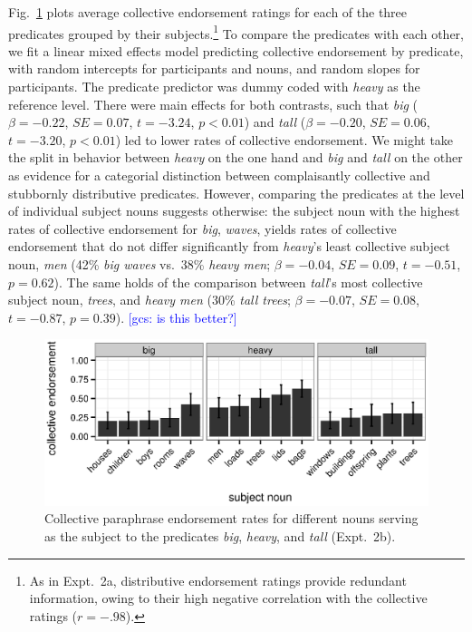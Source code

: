 \documentclass[linguex]{sp}
\newcommand{\ndg}[1]{\textcolor{Green}{[ndg: #1]}}
\newcommand{\gcs}[1]{\textcolor{blue}{[gcs: #1]}}
\begin{document}

Fig.~\ref{bhtcoll} plots average collective endorsement ratings for each of the three predicates grouped by their subjects.\footnote{As in Expt.~2a, distributive endorsement ratings provide redundant information, owing to their high negative correlation with the collective ratings ($r=-.98$).}
%
%
To compare the predicates with each other, we fit a linear mixed effects model predicting collective endorsement by predicate, with random intercepts for participants and nouns, and random slopes for participants. The predicate predictor was dummy coded with \emph{heavy} as the reference level. There were main effects for both contrasts, such that \emph{big} ($\beta=-0.22$, $SE=0.07$, $t=-3.24$, $p<0.01$) and \emph{tall} ($\beta=-0.20$, $SE=0.06$, $t=-3.20$, $p<0.01$) led to lower rates of collective endorsement. We might take the split in behavior between \emph{heavy} on the one hand and \emph{big} and \emph{tall} on the other as evidence for a categorial distinction between complaisantly collective and stubbornly distributive predicates. However, comparing the predicates at the level of individual subject nouns suggests otherwise: the subject noun with the highest rates of collective endorsement for \emph{big}, \emph{waves}, yields rates of collective endorsement that do not differ significantly from \emph{heavy}'s least collective subject noun, \emph{men} (42\% \emph{big waves} vs.~38\% \emph{heavy men}; $\beta=-0.04$, $SE=0.09$, $t=-0.51$, $p=0.62$). The same holds of the comparison between \emph{tall}'s most collective subject noun, \emph{trees}, and \emph{heavy men} (30\% \emph{tall trees}; $\beta=-0.07$, $SE=0.08$, $t=-0.87$, $p=0.39$). \gcs{is this better?}
%

\begin{figure}[htb]
	\centering
	\includegraphics[width=.85\linewidth]{plots/bht_plot2.eps}
	\vspace{0pt}
	\caption{Collective paraphrase endorsement rates for different nouns serving as the subject to the predicates \emph{big}, \emph{heavy}, and \emph{tall} (Expt.~2b).} \label{bhtcoll}
\end{figure}
\end{document}
